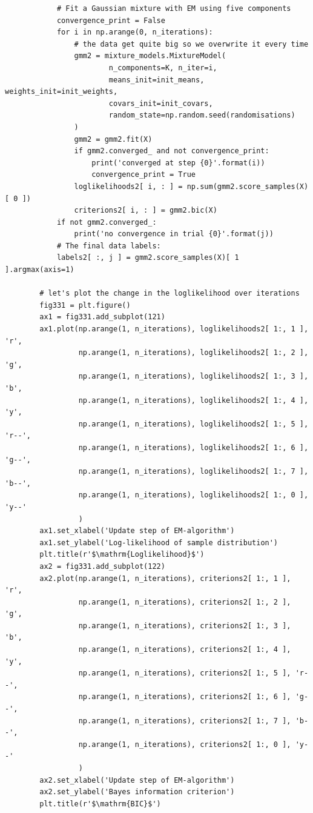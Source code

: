 \begin{verbatim}
            # Fit a Gaussian mixture with EM using five components
            convergence_print = False
            for i in np.arange(0, n_iterations):
                # the data get quite big so we overwrite it every time
                gmm2 = mixture_models.MixtureModel(
                        n_components=K, n_iter=i,
                        means_init=init_means, weights_init=init_weights,
                        covars_init=init_covars,
                        random_state=np.random.seed(randomisations)
                )
                gmm2 = gmm2.fit(X)
                if gmm2.converged_ and not convergence_print:
                    print('converged at step {0}'.format(i))
                    convergence_print = True
                loglikelihoods2[ i, : ] = np.sum(gmm2.score_samples(X)[ 0 ])
                criterions2[ i, : ] = gmm2.bic(X)
            if not gmm2.converged_:
                print('no convergence in trial {0}'.format(j))
            # The final data labels:
            labels2[ :, j ] = gmm2.score_samples(X)[ 1 ].argmax(axis=1)

        # let's plot the change in the loglikelihood over iterations
        fig331 = plt.figure()
        ax1 = fig331.add_subplot(121)
        ax1.plot(np.arange(1, n_iterations), loglikelihoods2[ 1:, 1 ], 'r',
                 np.arange(1, n_iterations), loglikelihoods2[ 1:, 2 ], 'g',
                 np.arange(1, n_iterations), loglikelihoods2[ 1:, 3 ], 'b',
                 np.arange(1, n_iterations), loglikelihoods2[ 1:, 4 ], 'y',
                 np.arange(1, n_iterations), loglikelihoods2[ 1:, 5 ], 'r--',
                 np.arange(1, n_iterations), loglikelihoods2[ 1:, 6 ], 'g--',
                 np.arange(1, n_iterations), loglikelihoods2[ 1:, 7 ], 'b--',
                 np.arange(1, n_iterations), loglikelihoods2[ 1:, 0 ], 'y--'
                 )
        ax1.set_xlabel('Update step of EM-algorithm')
        ax1.set_ylabel('Log-likelihood of sample distribution')
        plt.title(r'$\mathrm{Loglikelihood}$')
        ax2 = fig331.add_subplot(122)
        ax2.plot(np.arange(1, n_iterations), criterions2[ 1:, 1 ], 'r',
                 np.arange(1, n_iterations), criterions2[ 1:, 2 ], 'g',
                 np.arange(1, n_iterations), criterions2[ 1:, 3 ], 'b',
                 np.arange(1, n_iterations), criterions2[ 1:, 4 ], 'y',
                 np.arange(1, n_iterations), criterions2[ 1:, 5 ], 'r--',
                 np.arange(1, n_iterations), criterions2[ 1:, 6 ], 'g--',
                 np.arange(1, n_iterations), criterions2[ 1:, 7 ], 'b--',
                 np.arange(1, n_iterations), criterions2[ 1:, 0 ], 'y--'
                 )
        ax2.set_xlabel('Update step of EM-algorithm')
        ax2.set_ylabel('Bayes information criterion')
        plt.title(r'$\mathrm{BIC}$')


\end{verbatim}
